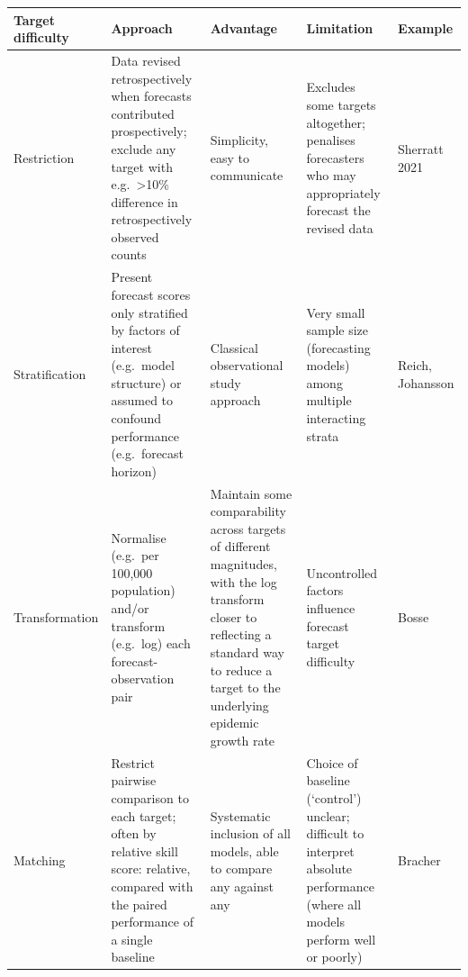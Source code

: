 \documentclass[
  letterpaper,
  DIV=11,
  numbers=noendperiod]{scrartcl}
\begin{document}
\begin{longtable}[]{@{}
  >{\raggedright\arraybackslash}p{}
  >{\raggedright\arraybackslash}p{}
  >{\raggedright\arraybackslash}p{}
  >{\raggedright\arraybackslash}p{}
  >{\raggedright\arraybackslash}p{}@{}}
\toprule\noalign{}
\begin{minipage}[b]{\linewidth}\raggedright
Target difficulty
\end{minipage} & \begin{minipage}[b]{\linewidth}\raggedright
Approach
\end{minipage} & \begin{minipage}[b]{\linewidth}\raggedright
Advantage
\end{minipage} & \begin{minipage}[b]{\linewidth}\raggedright
Limitation
\end{minipage} & \begin{minipage}[b]{\linewidth}\raggedright
Example
\end{minipage} \\
\midrule\noalign{}
\endhead
\bottomrule\noalign{}
\endlastfoot
Restriction & Data revised retrospectively when forecasts contributed
prospectively; exclude any target with e.g.~\textgreater10\% difference
in retrospectively observed counts & Simplicity, easy to communicate &
Excludes some targets altogether; penalises forecasters who may
appropriately forecast the revised data & Sherratt 2021 \\
Stratification & Present forecast scores only stratified by factors of
interest (e.g.~model structure) or assumed to confound performance
(e.g.~forecast horizon) & Classical observational study approach & Very
small sample size (forecasting models) among multiple interacting strata
& Reich, Johansson \\
Transformation & Normalise (e.g.~per 100,000 population) and/or
transform (e.g.~log) each forecast-observation pair & Maintain some
comparability across targets of different magnitudes, with the log
transform closer to reflecting a standard way to reduce a target to the
underlying epidemic growth rate & Uncontrolled factors influence
forecast target difficulty & Bosse \\
Matching & Restrict pairwise comparison to each target; often by
relative skill score: relative, compared with the paired performance of
a single baseline & Systematic inclusion of all models, able to compare
any against any & Choice of baseline (`control') unclear; difficult to
interpret absolute performance (where all models perform well or poorly)
& Bracher \\
\end{longtable}
\end{document}
